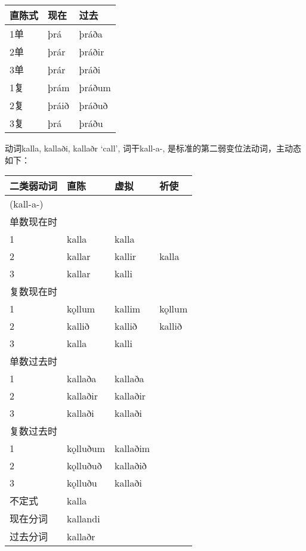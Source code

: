 \begin{longtable}{lll}
    \toprule
    直陈式 & 现在    & 过去     \\
    \midrule
    \endhead
    \bottomrule
    \endfoot
    1单  & þrá   & þráða  \\
    2单  & þrár  & þráðir \\
    3单  & þrár  & þráði  \\
    1复  & þrám  & þráðum \\
    2复  & þráið & þráðuð \\
    3复  & þrá   & þráðu  \\
\end{longtable}

动词kalla, kallaði, kallaðr `call‌', 词干kall-a-,
是标准的第二弱变位法动词，主动态如下：

\begin{longtable}{llll}
    \toprule
    二类弱动词     & 直陈       & 虚拟       & 祈使     \\
    \midrule
    \endhead
    \bottomrule
    \endfoot
    (kall-a-) &          &          &        \\
    单数现在时     &          &          &        \\
    1         & kalla    & kalla    &        \\
    2         & kallar   & kallir   & kalla  \\
    3         & kallar   & kalli    &        \\
    复数现在时     &          &          &        \\
    1         & kǫllum   & kallim   & kǫllum \\
    2         & kallið   & kallið   & kallið \\
    3         & kalla    & kalli    &        \\
    单数过去时     &          &          &        \\
    1         & kallaða  & kallaða  &        \\
    2         & kallaðir & kallaðir &        \\
    3         & kallaði  & kallaði  &        \\
    复数过去时     &          &          &        \\
    1         & kǫlluðum & kallaðim &        \\
    2         & kǫlluðuð & kallaðið &        \\
    3         & kǫlluðu  & kallaði  &        \\
    不定式       & kalla    &          &        \\
    现在分词      & kallandi &          &        \\
    过去分词      & kallaðr  &          &        \\
\end{longtable}

